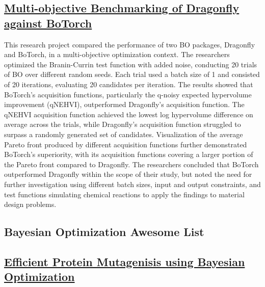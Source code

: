  \subsection*{\href{https://www.youtube.com/watch?v=Z7YiruHv3eE}{Multi-objective Benchmarking of Dragonfly against BoTorch}}

This research project compared the performance of two BO packages, Dragonfly\cite{JMLRdragonfly} and BoTorch\cite{balandat2020botorch}, in a multi-objective optimization context. The researchers optimized the Branin-Currin test function with added noise, conducting 20 trials of BO over different random seeds. Each trial used a batch size of 1 and consisted of 20 iterations, evaluating 20 candidates per iteration. The results showed that BoTorch's acquisition functions, particularly the q-noisy expected hypervolume improvement (qNEHVI)\cite{daulton2021parallel}, outperformed Dragonfly's acquisition function. The qNEHVI acquisition function achieved the lowest log hypervolume difference on average across the trials, while Dragonfly's acquisition function struggled to surpass a randomly generated set of candidates. Visualization of the average Pareto front produced by different acquisition functions further demonstrated BoTorch's superiority, with its acquisition functions covering a larger portion of the Pareto front compared to Dragonfly. The researchers concluded that BoTorch outperformed Dragonfly within the scope of their study, but noted the need for further investigation using different batch sizes, input and output constraints, and test functions simulating chemical reactions to apply the findings to material design problems.
 \subsection*{Bayesian Optimization Awesome List}


 \subsection*{\href{https://www.youtube.com/watch?v=fxpDX7Wmdc0}{Efficient Protein Mutagenisis using Bayesian Optimization}}

